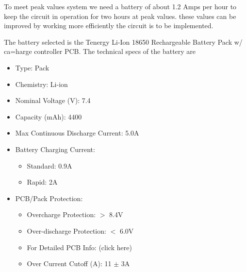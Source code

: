 \documentclass[12pt]{article}
\begin{document}
To meet peak values system we need a battery of about 1.2 Amps per hour to keep the circuit in operation for two hours at peak values. these values can be improved by working more efficiently the circuit is to be implemented.

The battery selected is the Tenergy Li-Ion 18650 Rechargeable Battery Pack w/ ca=harge controller PCB. The technical specs of the battery are

\begin{itemize}
  \item Type: Pack
  \item Chemistry: Li-ion
  \item Nominal Voltage (V): 7.4
  \item Capacity (mAh): 4400
  \item Max Continuous Discharge Current: 5.0A
  \item Battery Charging Current:
  \begin{itemize}
    \item Standard: 0.9A
    \item Rapid: 2A
  \end{itemize}
  \item PCB/Pack Protection:
  \begin{itemize}
    \item Overcharge Protection: $>$ 8.4V
    \item Over-discharge Protection: $<$ 6.0V
    \item For Detailed PCB Info: (click here)
    \item Over Current Cutoff (A): 11 $\pm$ 3A
  \end{itemize}
\end{itemize}
\end{document}
